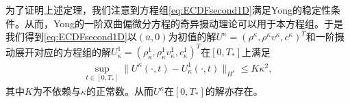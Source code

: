 
为了证明上述定理，我们注意到方程组\eqref{eq:ECDFsecond1D}满足Yong的稳定性条件\cite{yong1992singular,yong1999singular}。从而，Yong的一阶双曲偏微分方程的奇异摄动理论可以用于本方程组。于是我们得到\eqref{eq:ECDFsecond1D}以$(\bar{u},0)$为初值的解$U^\kappa = (\rho^\kappa, \rho^\kappa v^\kappa, c^\kappa)^T$和一阶摄动展开对应的方程组的解$U_\kappa^1=(\rho_\kappa^1,\rho_\kappa^1 v_\kappa^1, c^1_\kappa)^T$在$[0,T_*]$上满足
\begin{eqnarray}\label{53}
  \sup_{t \in [0, T_*]} \|U^\kappa(\cdot, t) - U_\kappa^1(\cdot, t)\|_{H^s} \le K\kappa^2,
\end{eqnarray}
其中$K$为不依赖与$\kappa$的正常数。从而$U^\kappa$在$[0,T_*]$的解亦存在。

